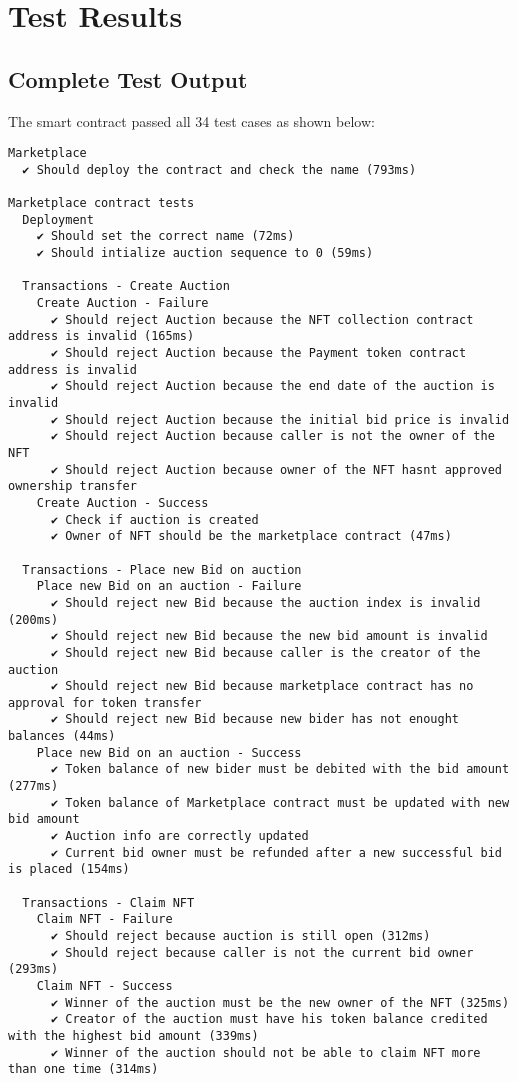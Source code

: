 \documentclass{article}
\begin{document}
\section{Test Results}

\subsection{Complete Test Output}
The smart contract passed all 34 test cases as shown below:

\begin{lstlisting}[caption={Hardhat Test Results},basicstyle=\footnotesize\ttfamily]
Marketplace
  ✔ Should deploy the contract and check the name (793ms)

Marketplace contract tests
  Deployment
    ✔ Should set the correct name (72ms)
    ✔ Should intialize auction sequence to 0 (59ms)
  
  Transactions - Create Auction
    Create Auction - Failure
      ✔ Should reject Auction because the NFT collection contract address is invalid (165ms)
      ✔ Should reject Auction because the Payment token contract address is invalid
      ✔ Should reject Auction because the end date of the auction is invalid
      ✔ Should reject Auction because the initial bid price is invalid
      ✔ Should reject Auction because caller is not the owner of the NFT
      ✔ Should reject Auction because owner of the NFT hasnt approved ownership transfer
    Create Auction - Success
      ✔ Check if auction is created
      ✔ Owner of NFT should be the marketplace contract (47ms)
  
  Transactions - Place new Bid on auction
    Place new Bid on an auction - Failure
      ✔ Should reject new Bid because the auction index is invalid (200ms)
      ✔ Should reject new Bid because the new bid amount is invalid
      ✔ Should reject new Bid because caller is the creator of the auction
      ✔ Should reject new Bid because marketplace contract has no approval for token transfer
      ✔ Should reject new Bid because new bider has not enought balances (44ms)
    Place new Bid on an auction - Success
      ✔ Token balance of new bider must be debited with the bid amount (277ms)
      ✔ Token balance of Marketplace contract must be updated with new bid amount
      ✔ Auction info are correctly updated
      ✔ Current bid owner must be refunded after a new successful bid is placed (154ms)
  
  Transactions - Claim NFT
    Claim NFT - Failure
      ✔ Should reject because auction is still open (312ms)
      ✔ Should reject because caller is not the current bid owner (293ms)
    Claim NFT - Success
      ✔ Winner of the auction must be the new owner of the NFT (325ms)
      ✔ Creator of the auction must have his token balance credited with the highest bid amount (339ms)
      ✔ Winner of the auction should not be able to claim NFT more than one time (314ms)
  

\end{lstlisting}
\end{document}
